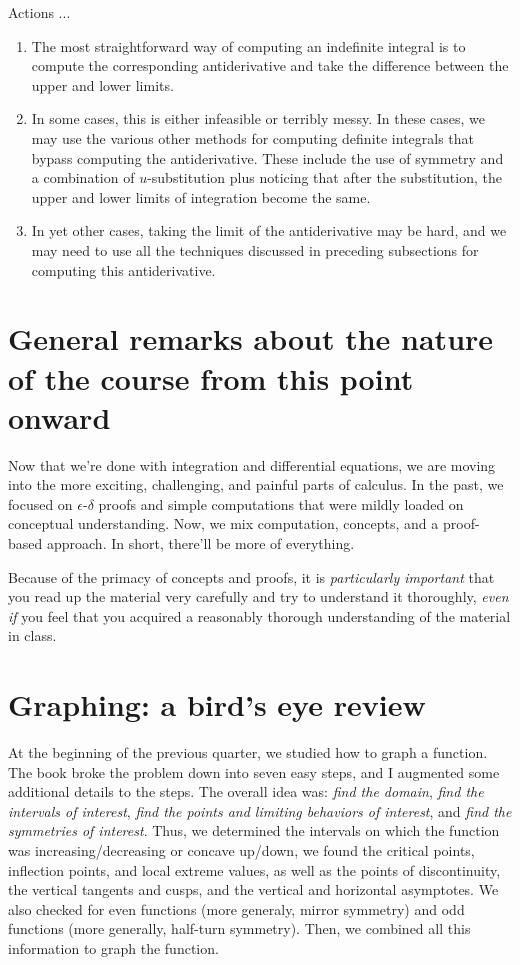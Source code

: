 \documentclass[10pt]{amsart}
\begin{document}
Actions ...

\begin{enumerate}
\item The most straightforward way of computing an indefinite integral
  is to compute the corresponding antiderivative and take the
  difference between the upper and lower limits.
\item In some cases, this is either infeasible or terribly messy. In
  these cases, we may use the various other methods for computing
  definite integrals that bypass computing the antiderivative. These
  include the use of symmetry and a combination of $u$-substitution
  plus noticing that after the substitution, the upper and lower
  limits of integration become the same.
\item In yet other cases, taking the limit of the antiderivative may
  be hard, and we may need to use all the techniques discussed in
  preceding subsections for computing this antiderivative.
\end{enumerate}

\section*{General remarks about the nature of the course from this point onward}

Now that we're done with integration and differential equations, we
are moving into the more exciting, challenging, and painful parts of
calculus. In the past, we focused on $\epsilon$-$\delta$ proofs and
simple computations that were mildly loaded on conceptual
understanding. Now, we mix computation, concepts, and a proof-based
approach. In short, there'll be more of everything.

Because of the primacy of concepts and proofs, it is {\em particularly
important} that you read up the material very carefully and try to
understand it thoroughly, {\em even if} you feel that you acquired a
reasonably thorough understanding of the material in class.

\section{Graphing: a bird's eye review}

At the beginning of the previous quarter, we studied how to graph a
function. The book broke the problem down into seven easy steps, and I
augmented some additional details to the steps. The overall idea was:
{\em find the domain}, {\em find the intervals of interest}, {\em find
the points and limiting behaviors of interest}, and {\em find the
symmetries of interest}. Thus, we determined the intervals on which
the function was increasing/decreasing or concave up/down, we found
the critical points, inflection points, and local extreme values, as
well as the points of discontinuity, the vertical tangents and cusps,
and the vertical and horizontal asymptotes. We also checked for even
functions (more generaly, mirror symmetry) and odd functions (more
generally, half-turn symmetry). Then, we combined all this information
to graph the function.
\end{document}
